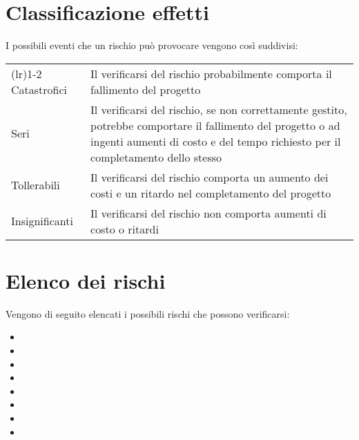 \section{Classificazione effetti}
I possibili eventi che un rischio può provocare vengono così suddivisi:
\begin{center}
	\begin{tabularx}{\widthTab}{ l  X } 
		\toprule
			\formattaTitoloTab{Classificazione} & \formattaTitoloTab{Effetti} \\
		\cmidrule(l{\cmidrulekern}r{\cmidrulekern}){1-2}
			Catastrofici & Il verificarsi del rischio probabilmente comporta il fallimento del progetto \\ 
			\addlinespace[1em] 
			Seri & Il verificarsi del rischio, se non correttamente gestito, potrebbe comportare il fallimento del progetto o ad ingenti aumenti di costo e del tempo richiesto per il completamento dello stesso \\ 
			\addlinespace[1em] 
			Tollerabili & Il verificarsi del rischio comporta un aumento dei costi e un ritardo nel completamento del progetto  \\ 
			\addlinespace[1em] 
			Insignificanti & Il verificarsi del rischio non comporta aumenti di costo o ritardi \\
		\bottomrule
	\end{tabularx}
\end{center}

\section{Elenco dei rischi}
Vengono di seguito elencati i possibili rischi che possono verificarsi:
\begin{itemize}
	\item {}
	\item {}
	\item {}
	\item {}
	\item {}
	\item {}
	\item {}
	\item {}
\end{itemize}


